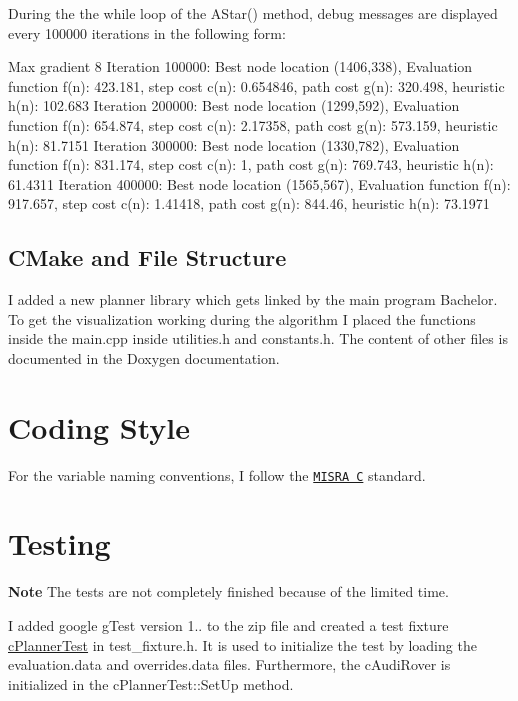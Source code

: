During the the while loop of the A\+Star() method, debug messages are displayed every 100000 iterations in the following form\+:


\begin{DoxyCode}
Max gradient 8
Iteration 100000: Best node location (1406,338), 
     Evaluation function f(n): 423.181, step cost c(n): 0.654846, path cost g(n): 320.498, heuristic h(n):
       102.683
Iteration 200000: Best node location (1299,592), 
     Evaluation function f(n): 654.874, step cost c(n): 2.17358, path cost g(n): 573.159, heuristic h(n):
       81.7151
Iteration 300000: Best node location (1330,782), 
     Evaluation function f(n): 831.174, step cost c(n): 1, path cost g(n): 769.743, heuristic h(n): 61.4311
Iteration 400000: Best node location (1565,567), 
     Evaluation function f(n): 917.657, step cost c(n): 1.41418, path cost g(n): 844.46, heuristic h(n):
       73.1971
\end{DoxyCode}


\subsection*{C\+Make and File Structure}

I added a new planner library which gets linked by the main program Bachelor. To get the visualization working during the algorithm I placed the functions inside the main.\+cpp inside utilities.\+h and constants.\+h. The content of other files is documented in the Doxygen documentation. ~\newline


\section*{Coding Style}

For the variable naming conventions, I follow the \href{https://en.wikipedia.org/wiki/MISRA_C}{\tt M\+I\+S\+RA C} standard.

\section*{Testing}

{\bfseries Note} The tests are not completely finished because of the limited time.

I added google g\+Test version 1.. to the zip file and created a test fixture \mbox{\hyperlink{classc_planner_test}{c\+Planner\+Test}} in test\+\_\+fixture.\+h. It is used to initialize the test by loading the evaluation.\+data and overrides.\+data files. Furthermore, the c\+Audi\+Rover is initialized in the c\+Planner\+Test\+::\+Set\+Up method.

